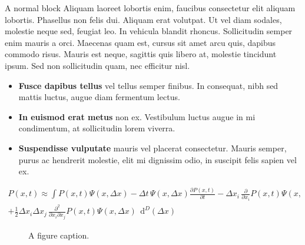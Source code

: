 \documentclass[final]{beamer}
\newlength{\colwidth}
\begin{document}
\begin{frame}[t]
\begin{columns}[t]
\begin{column}{\colwidth}
\begin{block}{A normal block}
   Aliquam laoreet lobortis enim, faucibus consectetur elit aliquam lobortis. Phasellus non felis dui. Aliquam erat volutpat. Ut vel diam sodales, molestie neque sed, feugiat leo. In vehicula blandit rhoncus. Sollicitudin semper enim mauris a orci. Maecenas quam est, cursus sit amet arcu quis, dapibus commodo risus. Mauris est neque, sagittis quis libero at, molestie tincidunt ipsum. Sed non sollicitudin quam, nec efficitur nisl.
   

    
 
    \begin{itemize}
      \item \textbf{Fusce dapibus tellus} vel tellus semper finibus. In
        consequat, nibh sed mattis luctus, augue diam fermentum lectus.
      \item \textbf{In euismod erat metus} non ex. Vestibulum luctus augue in
        mi condimentum, at sollicitudin lorem viverra.
      \item \textbf{Suspendisse vulputate} mauris vel placerat consectetur.
        Mauris semper, purus ac hendrerit molestie, elit mi dignissim odio, in
        suscipit felis sapien vel ex.
    \end{itemize}
    
    
\begin{align*}
P(x,t) \approx
\int  P(x,t) \Psi\left(x, \Delta x \right)  - \Delta t \, \Psi\left(x, \Delta x \right) \frac{ \partial P(x,t) }{ \partial t}  - \Delta x_{i} \, \frac{\partial }{\partial x_{i}}  P(x,t) \Psi\left(x, \Delta x \right)   \\
 + \frac{1}{2} \Delta x_{i} \Delta x_{j} \, \frac{\partial^2}{\partial x_{i} \partial x_{j} }  P(x,t) \Psi\left(x, \Delta x \right) \; \, \mathrm d^D \! \left( \Delta x \right)
\end{align*}

    \begin{figure}
      \centering
      \caption{A figure caption.}
    \end{figure}
    


\end{block}
\end{column}
\end{columns}
\end{frame}
\end{document}
